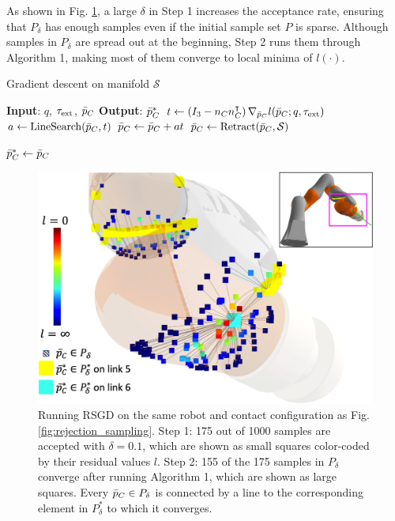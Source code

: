 As shown in Fig. \ref{fig:rsgd}, a large $\delta$ in Step 1 increases the acceptance rate, ensuring that $P_{\delta}$ has enough samples even if the initial sample set $P$ is sparse. Although samples in $P_{\delta}$ are spread out at the beginning, Step 2 runs them through Algorithm 1, making most of them converge to local minima of $l(\cdot)$.
\begin{algorithm}[h]
\caption{Gradient descent on manifold $\mathcal{S}$}\label{algo:gradient_descent}
\textbf{Input}: ${q}$, $\tau_{\text{ext}}$, $\bar{p}_C$\; 
\textbf{Output}: $\bar{p}_C^*$\;
 {
    ${t} \gets \left({I}_3 - {n}_C {n}_C^\intercal \right)\nabla_{\bar{p}_C} l(\bar{p}_C; q, \tau_{\text{ext}})$ \label{algo:gradient_descent:gradient_projection}\;
    $a \gets \mathrm{LineSearch}(\bar{p}_C, {t})$ \label{algo:gradient_descent:line_search}\;
    $\bar{p}_C \gets \bar{p}_C + a {t}$\;
    $\bar{p}_C \gets \mathrm{Retract}(\bar{p}_C, \mathcal{S})$ \label{algo:gradient_descent:retract}\;
}

$\bar{p}_C^* \gets \bar{p}_C$\;
\end{algorithm}

\begin{figure}[h]
\centering
\includegraphics[width=0.9\linewidth]{figures/05_force_from_torque/rsgd.png}
\caption{Running RSGD on the same robot and contact configuration as Fig. \ref{fig:rejection_sampling}. Step 1: 175 out of 1000 samples are accepted with $\delta = 0.1$, which are shown as small squares color-coded by their residual values $l$. Step 2: 155 of the 175 samples in $P_\delta$ converge after running Algorithm 1, which are shown as large squares. Every $\bar{p}_C \in P_\delta$ is connected by a line to the corresponding element in $P_\delta^*$ to which it converges.}
\label{fig:rsgd}
\end{figure}

